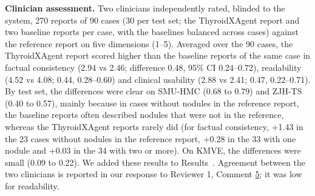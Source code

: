 \textbf{Clinician assessment.} Two clinicians independently rated, blinded to the system, 270 reports of 90 cases (30 per test set; the ThyroidXAgent report and two baseline reports per case, with the baselines balanced across cases) against the reference report on five dimensions (1--5). Averaged over the 90 cases, the ThyroidXAgent report scored higher than the baseline reports of the same case in factual consistency (2.94 vs 2.46; difference 0.48, 95\% CI 0.24--0.72), readability (4.52 vs 4.08; 0.44, 0.28--0.60) and clinical usability (2.88 vs 2.41; 0.47, 0.22--0.71). By test set, the differences were clear on SMU-HMC (0.68 to 0.79) and ZJH-TS (0.40 to 0.57), mainly because in cases without nodules in the reference report, the baseline reports often described nodules that were not in the reference, whereas the ThyroidXAgent reports rarely did (for factual consistency, +1.43 in the 23 cases without nodules in the reference report, +0.28 in the 33 with one nodule and +0.03 in the 34 with two or more). On KMVE, the differences were small (0.09 to 0.22). We added these results to Results~\SecResReport{}. Agreement between the two clinicians is reported in our response to Reviewer 1, Comment \hyperref[rev:R1.5]{5}; it was low for readability.\par
